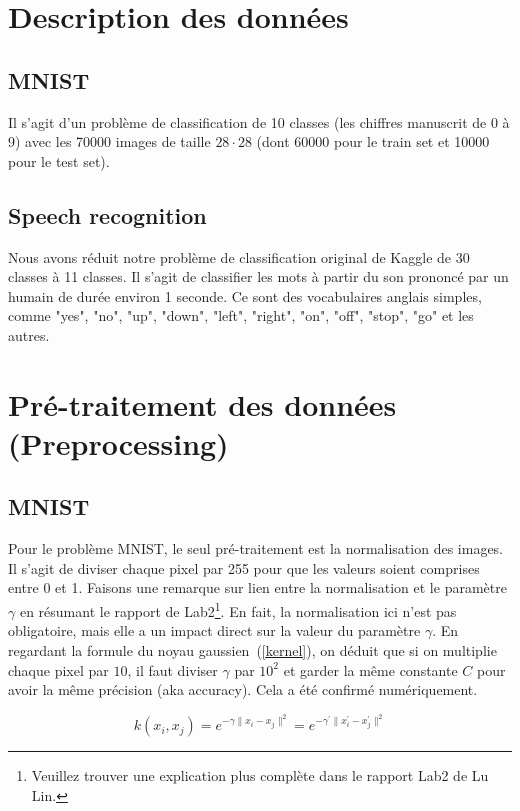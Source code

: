 \documentclass[12 pt, a4paper]{article}
\begin{document}
\section{Description des données}
\subsection{MNIST}
Il s'agit d'un problème de classification de 10 classes (les chiffres manuscrit de 0 à 9) avec les 70000 images de taille $28\cdot 28$ (dont 60000 pour le train set et 10000 pour le test set).

\subsection{Speech recognition}
Nous avons réduit notre problème de classification original de Kaggle de 30 classes à 11 classes. Il s'agit de classifier les mots à partir du son prononcé par un humain de durée environ 1 seconde. Ce sont des vocabulaires anglais simples, comme "yes", "no", "up", "down", "left", "right", "on", "off", "stop", "go" et les autres.



\section{Pré-traitement des données (Preprocessing)}
\subsection{MNIST}
Pour le problème MNIST, le seul pré-traitement est la normalisation des images. Il s'agit de diviser chaque pixel par 255 pour que les valeurs soient comprises entre 0 et 1. Faisons une remarque sur lien entre la normalisation et le paramètre $\gamma$ en résumant le rapport de Lab2\footnote{Veuillez trouver une explication plus complète dans le rapport Lab2 de Lu Lin.}. En fait, la normalisation ici n'est pas obligatoire, mais elle a un impact direct sur la valeur du paramètre $\gamma$. En regardant la formule du noyau gaussien~(\ref{kernel}), on déduit que si on multiplie chaque pixel par $10$, il faut diviser $\gamma$ par $10^{2}$ et garder la même constante $C$ pour avoir la même précision (aka accuracy). Cela a été confirmé numériquement. 

\begin{equation}\label{kernel}
k(x_{i}, x_{j}) = e^{-\gamma \| x_{i}- x_{j} \|^{2}} = e^{-\gamma^{\prime} \| x_{i}^{\prime}-x_{j}^{\prime}\|^{2}}
\end{equation}
\end{document}
